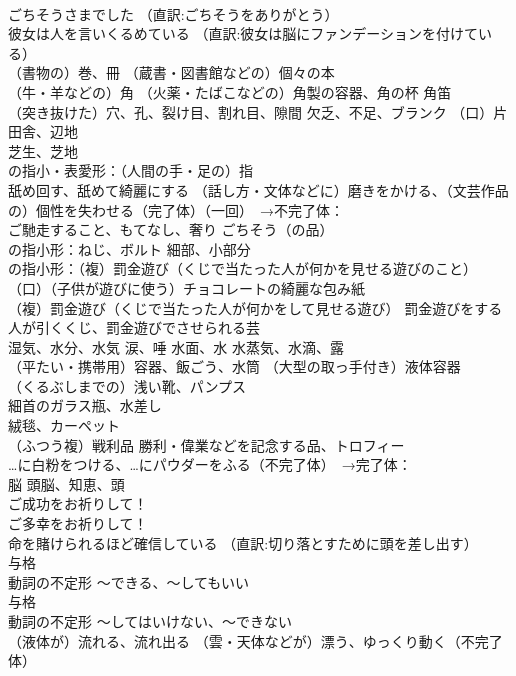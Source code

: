 \documentclass[8pt]{extreport}
\begin{document}
\begin{CJK}{UTF8}{min}
\\	ごちそうさまでした （直訳:ごちそうをありがとう）
\\	彼女は人を言いくるめている （直訳:彼女は脳にファンデーションを付けている）
\\	（書物の）巻、冊 （蔵書・図書館などの）個々の本
\\	（牛・羊などの）角 （火薬・たばこなどの）角製の容器、角の杯 角笛
\\	（突き抜けた）穴、孔、裂け目、割れ目、隙間 欠乏、不足、ブランク （口）片田舎、辺地
\\	芝生、芝地
\\	の指小・表愛形：（人間の手・足の）指
\\	舐め回す、舐めて綺麗にする （話し方・文体などに）磨きをかける、（文芸作品の）個性を失わせる（完了体）（一回）　→不完了体：
\\	ご馳走すること、もてなし、奢り ごちそう（の品）
\\	の指小形：ねじ、ボルト 細部、小部分
\\	の指小形：（複）罰金遊び（くじで当たった人が何かを見せる遊びのこと） （口）（子供が遊びに使う）チョコレートの綺麗な包み紙
\\	（複）罰金遊び（くじで当たった人が何かをして見せる遊び） 罰金遊びをする人が引くくじ、罰金遊びでさせられる芸
\\	湿気、水分、水気 涙、唾 水面、水 水蒸気、水滴、露
\\	（平たい・携帯用）容器、飯ごう、水筒 （大型の取っ手付き）液体容器
\\	（くるぶしまでの）浅い靴、パンプス
\\	細首のガラス瓶、水差し
\\	絨毯、カーペット
\\	（ふつう複）戦利品 勝利・偉業などを記念する品、トロフィー
\\	…に白粉をつける、…にパウダーをふる（不完了体）　→完了体：
\\	脳 頭脳、知恵、頭
\\	ご成功をお祈りして！
\\	ご多幸をお祈りして！
\\	命を賭けられるほど確信している （直訳:切り落とすために頭を差し出す）
\\	与格 
\\	動詞の不定形	〜できる、〜してもいい
\\	与格 
\\	動詞の不定形	〜してはいけない、〜できない
\\	（液体が）流れる、流れ出る （雲・天体などが）漂う、ゆっくり動く（不完了体） 

\end{CJK}
\end{document}
